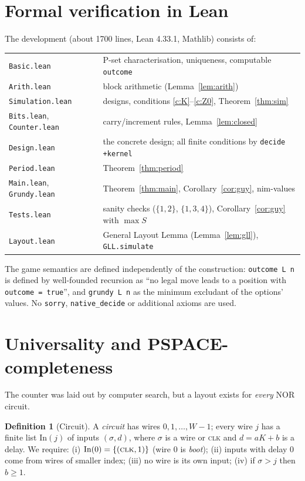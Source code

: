 \documentclass[11pt]{article}
\theoremstyle{definition}
\newtheorem{definition}[theorem]{Definition}
\begin{document}
\section{Formal verification in Lean}\label{sec:lean}

The development (about 1700 lines, Lean 4.33.1, Mathlib) consists of:
\begin{center}\small
\begin{tabular}{ll}
\toprule
\texttt{Basic.lean} & P-set characterisation, uniqueness, computable \texttt{outcome}\\
\texttt{Arith.lean} & block arithmetic (Lemma~\ref{lem:arith})\\
\texttt{Simulation.lean} & designs, conditions \ref{c:K}--\ref{c:Z0}, Theorem~\ref{thm:sim}\\
\texttt{Bits.lean}, \texttt{Counter.lean} & carry/increment rules, Lemma~\ref{lem:closed}\\
\texttt{Design.lean} & the concrete design; all finite conditions by \texttt{decide +kernel}\\
\texttt{Period.lean} & Theorem~\ref{thm:period}\\
\texttt{Main.lean}, \texttt{Grundy.lean} & Theorem~\ref{thm:main}, Corollary~\ref{cor:guy}, nim-values\\
\texttt{Tests.lean} & sanity checks ($\{1,2\}$, $\{1,3,4\}$), Corollary~\ref{cor:guy} with $\max S$\\
\texttt{Layout.lean} & General Layout Lemma (Lemma~\ref{lem:gll}), \texttt{GLL.simulate}\\
\bottomrule
\end{tabular}
\end{center}
The game semantics are defined independently of the construction: \texttt{outcome L n} is defined by
well-founded recursion as ``no legal move leads to a position with \texttt{outcome = true}'', and
\texttt{grundy L n} as the minimum excludant of the options' values.  No \texttt{sorry},
\texttt{native\_decide} or additional axioms are used.

\section{Universality and PSPACE-completeness}\label{sec:pspace}

The counter was laid out by computer search, but a layout exists for \emph{every} NOR circuit.

\begin{definition}[Circuit]\label{def:circuit}
A \emph{circuit} has wires $0,1,\dots,W-1$; every wire $j$ has a finite list $\mathrm{In}(j)$ of inputs
$(\sigma,d)$, where $\sigma$ is a wire or \textsc{clk} and $d=aK+b$ is a delay.  We require:
(i) $\mathrm{In}(0)=\{(\textsc{clk},1)\}$ (wire $0$ is \emph{boot});
(ii) inputs with delay $0$ come from wires of smaller index;
(iii) no wire is its own input;
(iv) if $\sigma>j$ then $b\ge1$.
\end{definition}
\end{document}
